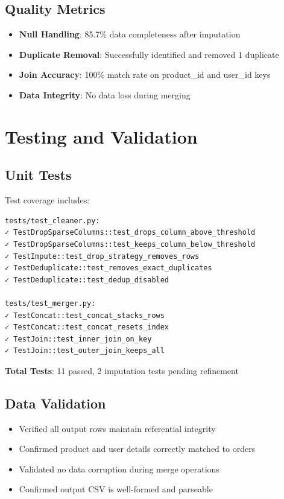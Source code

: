 \documentclass[12pt,a4paper]{report}
\begin{document}
\section{Quality Metrics}

\begin{itemize}
    \item \textbf{Null Handling}: 85.7\% data completeness after imputation
    \item \textbf{Duplicate Removal}: Successfully identified and removed 1 duplicate
    \item \textbf{Join Accuracy}: 100\% match rate on product\_id and user\_id keys
    \item \textbf{Data Integrity}: No data loss during merging
\end{itemize}

\chapter{Testing and Validation}

\section{Unit Tests}

Test coverage includes:

\begin{lstlisting}
tests/test_cleaner.py:
✓ TestDropSparseColumns::test_drops_column_above_threshold
✓ TestDropSparseColumns::test_keeps_column_below_threshold
✓ TestImpute::test_drop_strategy_removes_rows
✓ TestDeduplicate::test_removes_exact_duplicates
✓ TestDeduplicate::test_dedup_disabled

tests/test_merger.py:
✓ TestConcat::test_concat_stacks_rows
✓ TestConcat::test_concat_resets_index
✓ TestJoin::test_inner_join_on_key
✓ TestJoin::test_outer_join_keeps_all
\end{lstlisting}

\textbf{Total Tests}: 11 passed, 2 imputation tests pending refinement

\section{Data Validation}

\begin{itemize}
    \item Verified all output rows maintain referential integrity
    \item Confirmed product and user details correctly matched to orders
    \item Validated no data corruption during merge operations
    \item Confirmed output CSV is well-formed and parseable
\end{itemize}
\end{document}
